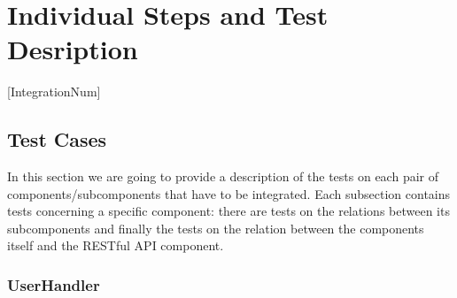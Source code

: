 \pagebreak
\section{Individual Steps and Test Desription}

[IntegrationNum]

\newcommand{\Test}[4]{
	\stepcounter{TestNum}
	\begin{center}
		\begin{tabular}{|l p{9 cm}|}
			\hline
			\textbf{Test Case Identifier} & I\arabic{IntegrationNum}T\arabic{TestNum}\\
			\textbf{Test Items} & #1\\
			\textbf{Input Specification} & #2\\
			\textbf{Output Specification} & #3\\
			\textbf{Environmental Needs} & #4\\
			\hline
		\end{tabular}
	\end{center}
}

\newcommand{\Procedure}[2]{
	\stepcounter{ProcNum}
	\begin{center}
		\begin{tabular}{|l l|}
			\hline
			\textbf{Test Procedure Identifier} & TP\arabic{ProcNum}\\
			\textbf{Purpose} & #1\\
			\textbf{Procedure Steps} & #2\\
			\hline
		\end{tabular}
	\end{center}
}

\subsection{Test Cases}

In this section we are going to provide a description of the tests on each pair of components/subcomponents that have to be integrated. 
Each subsection contains tests concerning a specific component: there are tests on the relations between its subcomponents and finally the tests on the relation between the components itself and the RESTful API component.


\subsubsection{UserHandler}


